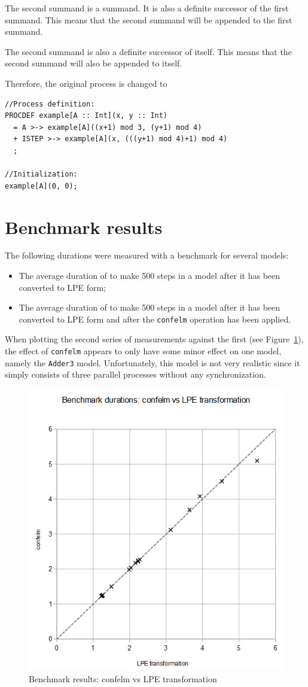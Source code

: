 The second summand is a \cistep{} summand.
It is also a definite successor of the first summand.
This means that the second summand will be appended to the first summand.

The second summand is also a definite successor of itself.
This means that the second summand will also be appended to itself.

Therefore, the original process is changed to

\begin{lstlisting}
//Process definition:
PROCDEF example[A :: Int](x, y :: Int)
  = A >-> example[A]((x+1) mod 3, (y+1) mod 4)
  + ISTEP >-> example[A](x, (((y+1) mod 4)+1) mod 4)
  ;

//Initialization:
example[A](0, 0);
\end{lstlisting}

\section{Benchmark results}

The following durations were measured with a benchmark for several models:
\begin{itemize}
\item The average duration of \txs{} to make 500 steps in a model after it has been converted to LPE form;
\item The average duration of \txs{} to make 500 steps in a model after it has been converted to LPE form and after the \texttt{confelm} operation has been applied.
\end{itemize}

When plotting the second series of measurements against the first (see Figure~\ref{confelm-vs-lpe-only:fig}), the effect of \texttt{confelm} appears to only have some minor effect on one model, namely the \texttt{Adder3} model.
Unfortunately, this model is not very realistic since it simply consists of three parallel processes without any synchronization.

\begin{figure}[!ht]
\begin{center}
\includegraphics[width=0.7\linewidth]{charts/confelm-vs-lpe-only}
\caption{Benchmark results: confelm vs LPE transformation}
\label{confelm-vs-lpe-only:fig}
\end{center}
\end{figure}


